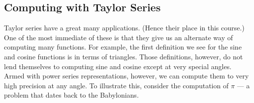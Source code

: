 \subsection{Computing with Taylor Series}


Taylor series have a great many applications. (Hence their place in this
course.) One of the most immediate of these is that they give us an
alternate way of computing many functions. For example, the first
definition we see for the sine and cosine functions is in terms of
triangles. Those definitions, however, do not lend themselves to
computing sine and cosine except at very special angles. Armed with
power series representations, however, we can compute
them to very high precision at any angle. To illustrate this, consider the
computation of $\pi$ --- a problem that dates back to the Babylonians.

